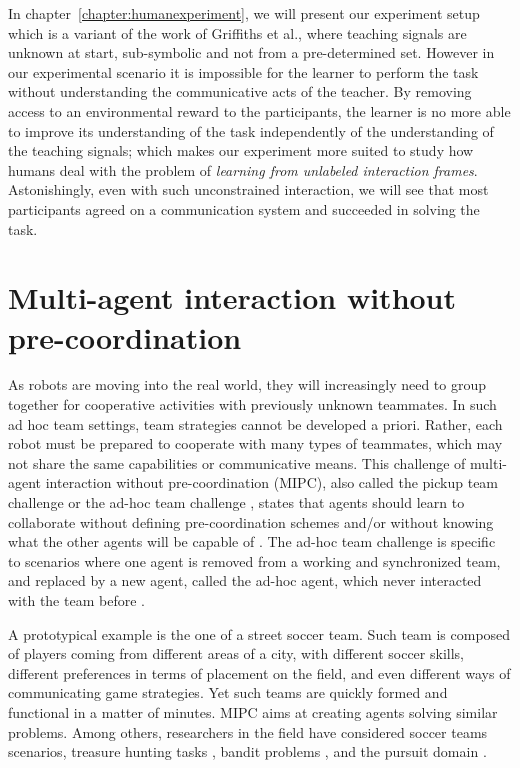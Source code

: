 In chapter~\ref{chapter:humanexperiment}, we will present our experiment setup which is a variant of the work of Griffiths et al., where teaching signals are unknown at start, sub-symbolic and not from a pre-determined set. However in our experimental scenario it is impossible for the learner to perform the task without understanding the communicative acts of the teacher. By removing access to an environmental reward to the participants, the learner is no more able to improve its understanding of the task independently of the understanding of the teaching signals; which makes our experiment more suited to study how humans deal with the problem of \emph{learning from unlabeled interaction frames}. Astonishingly, even with such unconstrained interaction, we will see that most participants agreed on a communication system and succeeded in solving the task.

\section{Multi-agent interaction without pre-coordination}

As robots are moving into the real world, they will increasingly need to group together for cooperative activities with previously unknown teammates. In such ad hoc team settings, team strategies cannot be developed a priori. Rather, each robot must be prepared to cooperate with many types of teammates, which may not share the same capabilities or communicative means. This challenge of multi-agent interaction without pre-coordination (MIPC), also called the pickup team challenge \cite{gil2006dynamically} or the ad-hoc team challenge \cite{stone2010ad}, states that agents should learn to collaborate without defining pre-coordination schemes and/or without knowing what the other agents will be capable of \cite{bowling2005coordination,gil2006dynamically,stone2010ad}. The ad-hoc team challenge is specific to scenarios where one agent is removed from a working and synchronized team, and replaced by a new agent, called the ad-hoc agent, which never interacted with the team before \cite{stone2010ad}.

A prototypical example is the one of a street soccer team. Such team is composed of players coming from different areas of a city, with different soccer skills, different preferences in terms of placement on the field, and even different ways of communicating game strategies. Yet such teams are quickly formed and functional in a matter of minutes. MIPC aims at creating agents solving similar problems. Among others, researchers in the field have considered soccer teams scenarios\cite{bowling2005coordination}, treasure hunting tasks \cite{gil2006dynamically}, bandit problems \cite{barrett2013communicating}, and the pursuit domain \cite{barrett2011empirical}.

